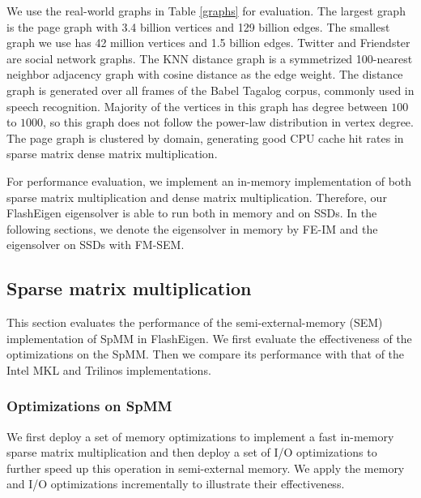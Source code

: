 We use the real-world graphs in Table \ref{graphs} for evaluation. The largest
graph is the page graph with 3.4 billion vertices and 129 billion edges.
The smallest graph we use has 42 million vertices and 1.5 billion edges.
Twitter and Friendster are social network graphs. The KNN distance graph is
a symmetrized 100-nearest neighbor adjacency graph with cosine distance as
the edge weight. The distance graph is generated over all frames of the Babel
Tagalog corpus, commonly used in speech recognition. Majority of the vertices
in this graph has degree between $100$ to $1000$, so this graph does not follow
the power-law distribution in vertex degree.
The page graph is clustered by domain, generating good CPU cache hit rates
in sparse matrix dense matrix multiplication.

For performance evaluation, we implement an in-memory implementation of both
sparse matrix multiplication and dense matrix multiplication. Therefore, our
FlashEigen eigensolver is able to run both in memory and on SSDs.
In the following sections, we denote the eigensolver in memory by FE-IM and
the eigensolver on SSDs with FM-SEM.

\subsection{Sparse matrix multiplication}
This section evaluates the performance of the semi-external-memory (SEM)
implementation of SpMM in FlashEigen. We first evaluate the effectiveness
of the optimizations on the SpMM. Then we compare its performance with that
of the Intel MKL and Trilinos implementations.

\subsubsection{Optimizations on SpMM}
We first deploy a set of memory optimizations to implement a fast
in-memory sparse matrix multiplication and then deploy a set of I/O
optimizations to further speed up this operation in semi-external memory.
We apply the memory and I/O optimizations incrementally to illustrate their
effectiveness.

